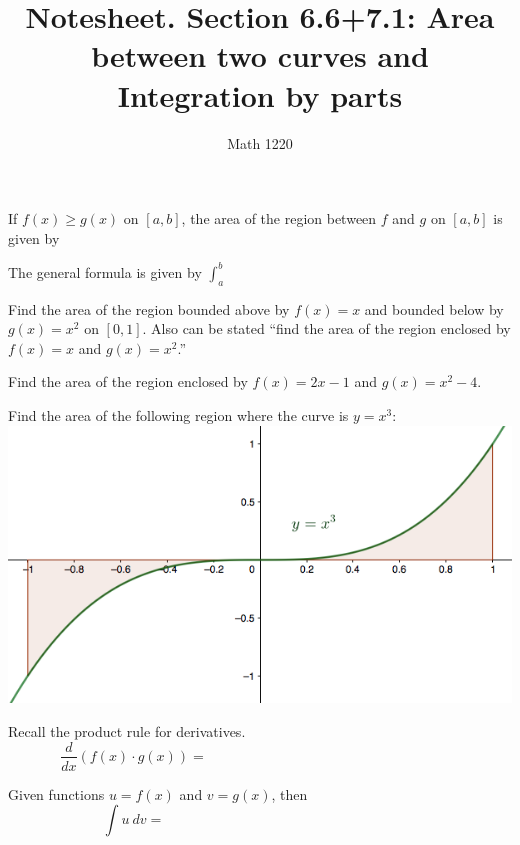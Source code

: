 \documentclass[12pt, a4paper]{article}
\author{Math 1220}
\title{Notesheet. Section 6.6+7.1: Area between two curves and
  Integration by parts}
\date{}
\begin{document}
\maketitle
\nameline
\begin{thrm}
  If \(f(x) \geq g(x)\) on \([a,b]\), the area of the region between
  \(f\) and \(g\) on \([a,b]\) is given by 
\end{thrm}
\begin{rmk}
  The general formula is given by \(\int_a^b\) \\
\end{rmk}
\vspace{0.5in}
\begin{ex}
  Find the area of the region bounded above by \(f(x) = x\) and bounded below
  by \(g(x) = x^2\) on \([0,1]\). Also can be stated ``find the area of the
  region enclosed by \(f(x) = x\) and \(g(x) = x^2\).''
\end{ex}
\begin{ex}
  Find the area of the region enclosed by \(f(x) = 2x-1\) and \(g(x) =
  x^2-4\).
\end{ex}
\begin{ex}
  Find the area of the following region where the curve is \(y = x^3\):\\
  \includegraphics[scale=0.4]{images/area-under-x3}
\end{ex}
\vspace{-1.5in}
\begin{thrm}
  Recall the product rule for derivatives. \[
    \frac{d}{dx}(f(x) \cdot g(x)) = \hspace{3in}
  \]
\end{thrm}
\vspace{0.25in}
\begin{thrm}
  Given functions \(u = f(x)\) and \(v = g(x)\), then \[
    \int u \ dv = \hspace{3in}
  \]
\end{thrm}
\end{document}
